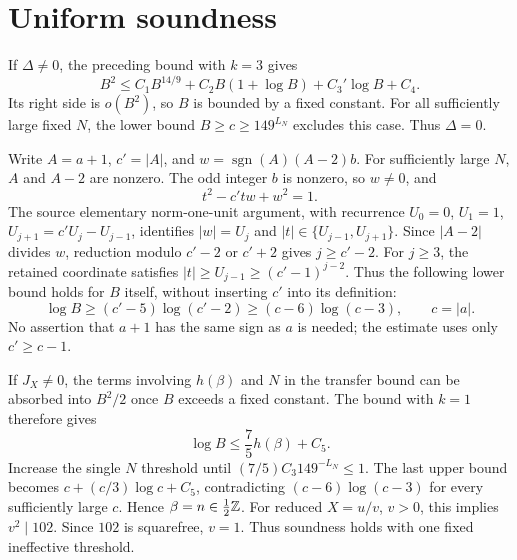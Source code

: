 \documentclass[11pt]{article}
\begin{document}
\section*{Uniform soundness}
If $\Delta\ne0$, the preceding bound with $k=3$ gives
\[
 B^2\le C_1 B^{14/9}+C_2 B(1+\log B)+C_3'\log B+C_4.
\]
Its right side is $o(B^2)$, so $B$ is bounded by a fixed constant.
For all sufficiently large fixed $N$, the lower bound
$B\ge c\ge149^{L_N}$ excludes this case. Thus $\Delta=0$.

Write $A=a+1$, $c'=|A|$, and
$w=\operatorname{sgn}(A)(A-2)b$. For sufficiently large $N$, $A$ and
$A-2$ are nonzero. The odd integer $b$ is nonzero, so $w\ne0$, and
\[
                     t^2-c'tw+w^2=1.
\]
The source elementary norm-one-unit argument, with recurrence
$U_0=0$, $U_1=1$, $U_{j+1}=c'U_j-U_{j-1}$, identifies
$|w|=U_j$ and $|t|\in\{U_{j-1},U_{j+1}\}$.
Since $|A-2|$ divides $w$, reduction modulo $c'-2$ or $c'+2$ gives
$j\ge c'-2$. For $j\ge3$, the retained coordinate satisfies
$|t|\ge U_{j-1}\ge(c'-1)^{j-2}$. Thus the following lower bound
holds for $B$ itself, without inserting $c'$ into its definition:
\[
 \log B\ge(c'-5)\log(c'-2)
          \ge(c-6)\log(c-3),\qquad c=|a|.
\]
No assertion that $a+1$ has the same sign as $a$ is needed; the estimate
uses only $c'\ge c-1$.

If $J_X\ne0$, the terms involving $h(\beta)$ and $N$ in the transfer
bound can be absorbed into $B^2/2$ once $B$ exceeds a fixed constant.
The bound with $k=1$ therefore gives
\[
                    \log B\le\frac75 h(\beta)+C_5.
\]
Increase the single $N$ threshold until
$(7/5)C_3 149^{-L_N}\le1$. The last upper bound becomes
$c+(c/3)\log c+C_5$, contradicting
$(c-6)\log(c-3)$ for every sufficiently large $c$.
Hence $\beta=n\in\tfrac12\mathbb Z$. For reduced $X=u/v$, $v>0$,
this implies $v^2\mid102$. Since $102$ is squarefree, $v=1$.
Thus soundness holds with one fixed ineffective threshold.
\end{document}
